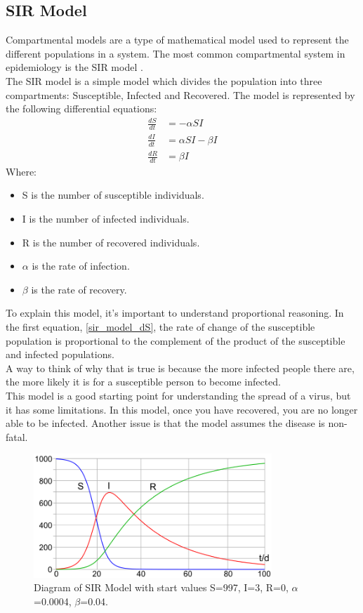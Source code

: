 \documentclass{report}
\begin{document}
\subsection{SIR Model}
Compartmental models are a type of mathematical model used to represent the different populations in a system. The most common compartmental system in epidemiology is the SIR model \cite{beckley2013modeling}.\\
The SIR model is a simple model which divides the population into three compartments: Susceptible, Infected and Recovered. The model is represented by the following differential equations:
\begin{align}
\frac{dS}{dt} &= -\alpha SI \label{sir_model_dS} \\
\frac{dI}{dt} &= \alpha SI - \beta I \label{sir_model_dI} \\
\frac{dR}{dt} &= \beta I \label{sir_model_dR}
\end{align}
Where:
\begin{itemize}
    \item S is the number of susceptible individuals.
    \item I is the number of infected individuals.
    \item R is the number of recovered individuals.
    \item $\alpha$ is the rate of infection.
    \item $\beta$ is the rate of recovery.
\end{itemize}
To explain this model, it's important to understand proportional reasoning. In the first equation, \ref{sir_model_dS}, the rate of change of the susceptible population is proportional to the complement of the product of the susceptible and infected populations.\\
A way to think of why that is true is because the more infected people there are, the more likely it is for a susceptible person to become infected.\\
This model is a good starting point for understanding the spread of a virus, but it has some limitations. In this model, once you have recovered, you are no longer able to be infected. Another issue is that the model assumes the disease is non-fatal.

\begin{center}
    \begin{figure}[h]
        \centering
        \includegraphics[width=0.8\textwidth]{SIR-Model.png}
        \caption{Diagram of SIR Model with start values S=997, I=3, R=0, $\alpha$=0.0004, $\beta$=0.04. \cite{sirmodel}}
        \label{fig:sir_model}
    \end{figure}
\end{center}
\end{document}
